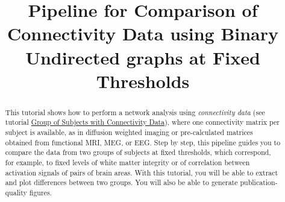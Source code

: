 \documentclass[justified]{tufte-handout}
\title[Comparison of Connectivity Data using BUT]{Pipeline for Comparison of Connectivity Data using Binary Undirected graphs at Fixed Thresholds}
\begin{document}
\maketitle

\begin{abstract}
\noindent
This tutorial shows how to perform a network analysis using \emph{connectivity data} (see tutorial \href{https://github.com/braph-software/BRAPH-2/tree/develop/tutorials/general/tut_gr_con}{Group of Subjects with Connectivity Data}), where one connectivity matrix per subject is available, as in diffusion weighted imaging or pre-calculated matrices obtained from functional MRI, MEG, or EEG. Step by step, this pipeline guides you to compare the data from two groups of subjects at fixed thresholds, which correspond, for example, to fixed levels of white matter integrity or of correlation between activation signals of pairs of brain areas.  With this tutorial, you will be able to extract and plot differences between two groups. You will also be able to generate publication-quality figures.
\end{abstract}
\end{document}
